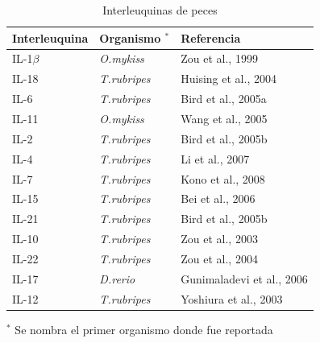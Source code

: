 \documentclass[12pt,letterpaper,oneside]{scrbook}
\begin{document}
\begin{table}[h!]
    \begin{center}
        \begin{threeparttable}
            \caption{Interleuquinas de peces}\label{tabla:ils}
            \begin{tabular}{@{}lll@{}}
\toprule
Interleuquina & Organismo $^*$          & Referencia                \\ \midrule
IL-1$\beta$   & \textit{O.mykiss}   & Zou et al., 1999          \\
IL-18         & \textit{T.rubripes} & Huising et al., 2004      \\
IL-6          & \textit{T.rubripes} & Bird et al., 2005a        \\
IL-11         & \textit{O.mykiss}   & Wang et al., 2005         \\
IL-2          & \textit{T.rubripes} & Bird et al., 2005b        \\
IL-4          & \textit{T.rubripes} & Li et al., 2007           \\
IL-7          & \textit{T.rubripes} & Kono et al., 2008         \\
IL-15         & \textit{T.rubripes} & Bei et al., 2006          \\
IL-21         & \textit{T.rubripes} & Bird et al., 2005b        \\
IL-10         & \textit{T.rubripes} & Zou et al., 2003          \\
IL-22         & \textit{T.rubripes} & Zou et al., 2004          \\
IL-17         & \textit{D.rerio}    & Gunimaladevi et al., 2006 \\
IL-12         & \textit{T.rubripes} & Yoshiura et al., 2003     \\ \bottomrule
            \end{tabular}
                \begin{tablenotes}
                    \item $^*$ Se nombra el primer organismo donde fue reportada
                \end{tablenotes}
                \end{threeparttable}    
                \end{center}
                \end{table}
\end{document}
